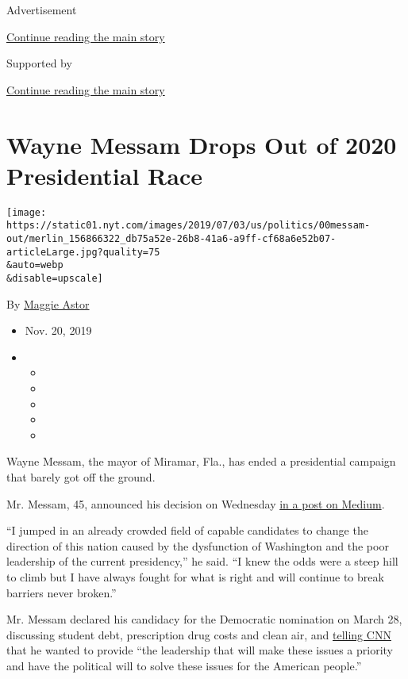 Advertisement

\protect\hyperlink{after-top}{Continue reading the main story}

Supported by

\protect\hyperlink{after-sponsor}{Continue reading the main story}

\hypertarget{wayne-messam-drops-out-of-2020-presidential-race}{%
\section{Wayne Messam Drops Out of 2020 Presidential
Race}\label{wayne-messam-drops-out-of-2020-presidential-race}}

\texttt{[image: https://static01.nyt.com/images/2019/07/03/us/politics/00messam-out/merlin\_156866322\_db75a52e-26b8-41a6-a9ff-cf68a6e52b07-articleLarge.jpg?quality=75\\\&auto=webp\\\&disable=upscale]}

By \href{https://www.nytimes.com/by/maggie-astor}{Maggie Astor}

\begin{itemize}
\item
  Nov. 20, 2019
\item
  \begin{itemize}
  \item
  \item
  \item
  \item
  \item
  \end{itemize}
\end{itemize}

Wayne Messam, the mayor of Miramar, Fla., has ended a presidential
campaign that barely got off the ground.

Mr. Messam, 45, announced his decision on Wednesday
\href{https://medium.com/@WAYNEMESSAM/i-am-suspending-my-2020-presidential-campaign-but-im-not-finished-yet-60f72ece2b49}{in
a post on Medium}.

``I jumped in an already crowded field of capable candidates to change
the direction of this nation caused by the dysfunction of Washington and
the poor leadership of the current presidency,'' he said. ``I knew the
odds were a steep hill to climb but I have always fought for what is
right and will continue to break barriers never broken.''

Mr. Messam declared his candidacy for the Democratic nomination on March
28, discussing student debt, prescription drug costs and clean air, and
\href{https://www.cnn.com/2019/03/28/politics/wayne-messam-announces-2020-bid/index.html}{telling
CNN} that he wanted to provide ``the leadership that will make these
issues a priority and have the political will to solve these issues for
the American people.''

